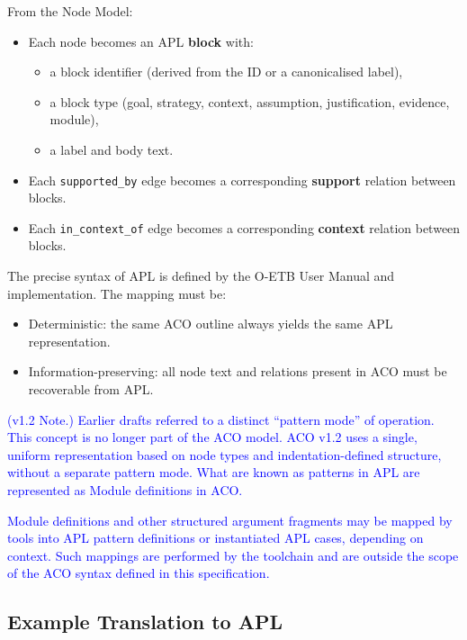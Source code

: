 \documentclass[11pt,twoside,a4paper]{article}
\begin{document}
From the Node Model:
\begin{itemize}[leftmargin=2em]
  \item Each node becomes an APL \textbf{block} with:
  \begin{itemize}[leftmargin=1.5em]
    \item a block identifier (derived from the ID or a canonicalised label),
    \item a block type (goal, strategy, context, assumption, justification, evidence, module),
    \item a label and body text.
  \end{itemize}

  \item Each \texttt{supported\_by} edge becomes a corresponding \textbf{support} relation between blocks.

  \item Each \texttt{in\_context\_of} edge becomes a corresponding \textbf{context} relation between blocks.
\end{itemize}

The precise syntax of APL is defined by the O-ETB User Manual and implementation.
The mapping must be:
\begin{itemize}[leftmargin=2em]
  \item Deterministic: the same ACO outline always yields the same APL representation.
  \item Information-preserving: all node text and relations present in ACO must be recoverable from APL.
\end{itemize}

\textcolor{blue}{(v1.2 Note.)
Earlier drafts referred to a distinct ``pattern mode'' of operation. This concept is
no longer part of the ACO model. ACO v1.2 uses a single, uniform representation based
on node types and indentation-defined structure, without a separate pattern mode. What are known as patterns in APL are represented as Module definitions in ACO.}

\textcolor{blue}{Module definitions and other structured argument fragments
may be mapped by tools into APL pattern definitions or instantiated APL cases, depending
on context. Such mappings are performed by the toolchain and are outside the scope of
the ACO syntax defined in this specification.}

\subsection{Example Translation to APL}
\end{document}
